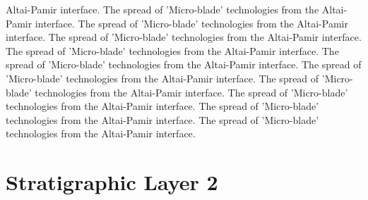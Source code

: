 Altai-Pamir interface. The spread of 'Micro-blade' technologies from the Altai-Pamir interface. The spread of 'Micro-blade' technologies from the Altai-Pamir interface. The spread of 'Micro-blade' technologies from the Altai-Pamir interface. The spread of 'Micro-blade' technologies from the Altai-Pamir interface. The spread of 'Micro-blade' technologies from the Altai-Pamir interface. The spread of 'Micro-blade' technologies from the Altai-Pamir interface. The spread of 'Micro-blade' technologies from the Altai-Pamir interface. The spread of 'Micro-blade' technologies from the Altai-Pamir interface. The spread of 'Micro-blade' technologies from the Altai-Pamir interface. The spread of 'Micro-blade' technologies from the Altai-Pamir interface. 

\section{Stratigraphic Layer 2}
